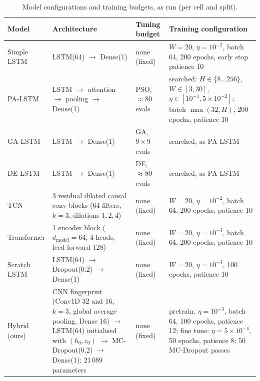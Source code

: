 \begin{table}[pos=tbp]
\caption{Model configurations and training budgets, as run (per cell and split).}
\label{tab:hyperparams}
\centering
\footnotesize
\begin{tabularx}{\textwidth}{l X l X}
\toprule
Model & Architecture & Tuning budget & Training configuration \\
\midrule
Simple LSTM & LSTM(64) $\to$ Dense(1) & none (fixed) & $W{=}20$, $\eta{=}10^{-2}$, batch 64, 200 epochs, early stop patience 10 \\
PA-LSTM & LSTM $\to$ attention $\to$ pooling $\to$ Dense(1) & PSO, ${\approx}80$ evals & searched: $H\in\{8\ldots256\}$, $W\in[3,30]$, $\eta\in[10^{-4},5{\times}10^{-2}]$; batch $\max(32,H)$, 200 epochs, patience 10 \\
GA-LSTM & LSTM $\to$ Dense(1) & GA, $9{\times}9$ evals & searched, as PA-LSTM \\
DE-LSTM & LSTM $\to$ Dense(1) & DE, ${\approx}80$ evals & searched, as PA-LSTM \\
TCN & 3 residual dilated causal conv blocks (64 filters, $k{=}3$, dilations $1,2,4$) & none (fixed) & $W{=}20$, $\eta{=}10^{-2}$, batch 64, 200 epochs, patience 10 \\
Transformer & 1 encoder block ($d_{\mathrm{model}}{=}64$, 4 heads, feed-forward 128) & none (fixed) & $W{=}20$, $\eta{=}10^{-3}$, batch 64, 200 epochs, patience 10 \\
\midrule
Scratch LSTM & LSTM(64) $\to$ Dropout(0.2) $\to$ Dense(1) & none (fixed) & $W{=}20$, $\eta{=}10^{-3}$, 100 epochs, patience 10 \\
Hybrid (ours) & CNN fingerprint (Conv1D 32 and 16, $k{=}3$, global average pooling, Dense 16) $\to$ LSTM(64) initialised with $(h_0,c_0)$ $\to$ MC-Dropout(0.2) $\to$ Dense(1); 21\,089 parameters & none (fixed) & pretrain: $\eta{=}10^{-3}$, batch 64, 100 epochs, patience 12; fine tune: $\eta{=}5{\times}10^{-4}$, 50 epochs, patience 8; 50 MC-Dropout passes \\
\bottomrule
\end{tabularx}
\end{table}
